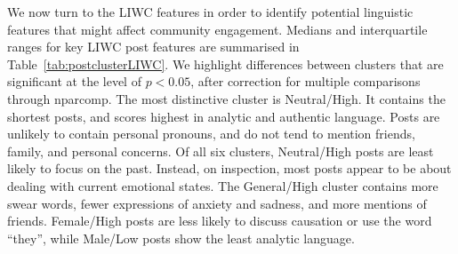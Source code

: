 We now turn to the LIWC features in order to identify potential linguistic features that might affect community engagement. 
Medians and interquartile ranges for key LIWC post features are summarised in Table~\ref{tab:postclusterLIWC}. We highlight differences between clusters that are significant at the level of $p<0.05$, after correction for multiple comparisons through nparcomp.
The most distinctive cluster is Neutral/High. It contains the shortest posts, and scores highest in analytic and authentic language. Posts are unlikely to contain personal pronouns, and do not tend to mention friends, family, and personal concerns. Of all six clusters, Neutral/High posts are least likely to focus on the past. Instead, on inspection, most posts appear to be about dealing with current emotional states. The General/High cluster contains more swear words, fewer expressions of anxiety and sadness, and more mentions of friends. Female/High posts are less likely to discuss causation or use the word ``they'', while Male/Low posts show the least analytic language. 

